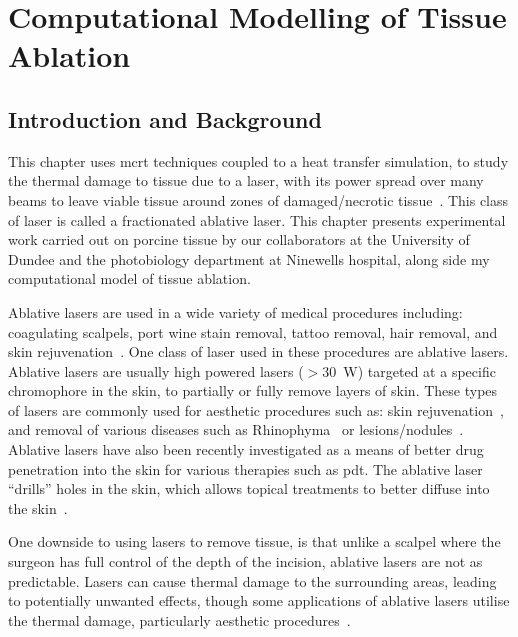 \chapter{Computational Modelling of Tissue Ablation}
\label{chap:ablation}
\section{Introduction and Background}
\label{sec:intro}

This chapter uses \gls*{mcrt} techniques coupled to a heat transfer simulation, to study the thermal damage to tissue due to a laser, with its power spread over many beams to leave viable tissue around zones of damaged/necrotic tissue~\cite{manstein2004fractional}. This class of laser is called a fractionated ablative laser. This chapter presents experimental work carried out on porcine tissue by our collaborators at the University of Dundee and the photobiology department at Ninewells hospital, along side my computational model of tissue ablation.

\medskip

Ablative lasers are used in a wide variety of medical procedures including: coagulating scalpels, port wine stain removal, tattoo removal, hair removal, and skin rejuvenation~\cite{amini2010ultrafast, tan1989treatment,kuperman2001laser,liew2002laser,hardaway2002nonablative}.
One class of laser used in these procedures are ablative lasers. Ablative lasers are usually high powered lasers ($>$30~W) targeted at a specific chromophore in the skin, to partially or fully remove layers of skin. These types of lasers are commonly used for aesthetic procedures such as: skin rejuvenation~\cite{hardaway2002nonablative}, and removal of various diseases such as Rhinophyma~\cite{shapshay1980removal} or lesions/nodules~\cite{valcavi2010percutaneous}. Ablative lasers have also been recently investigated as a means of better drug penetration into the skin for various therapies such as \gls*{pdt}. The ablative laser ``drills'' holes in the skin, which allows topical treatments to better diffuse into the skin~\cite{haedersdal2010fractional}.

One downside to using lasers to remove tissue, is that unlike a scalpel where the surgeon has full control of the depth of the incision, ablative lasers are not as predictable. Lasers can cause thermal damage to the surrounding areas, leading to potentially  unwanted effects, though some applications of ablative lasers utilise the thermal damage, particularly aesthetic procedures~\cite{alexiades2008spectrum}.

